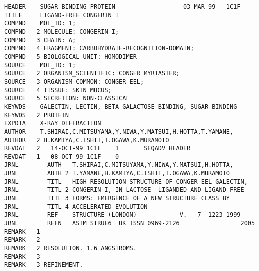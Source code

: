 \begin{lstlisting}
HEADER    SUGAR BINDING PROTEIN                   03-MAR-99   1C1F              
TITLE     LIGAND-FREE CONGERIN I                                                
COMPND    MOL_ID: 1;                                                            
COMPND   2 MOLECULE: CONGERIN I;                                                
COMPND   3 CHAIN: A;                                                            
COMPND   4 FRAGMENT: CARBOHYDRATE-RECOGNITION-DOMAIN;                           
COMPND   5 BIOLOGICAL_UNIT: HOMODIMER                                           
SOURCE    MOL_ID: 1;                                                            
SOURCE   2 ORGANISM_SCIENTIFIC: CONGER MYRIASTER;                               
SOURCE   3 ORGANISM_COMMON: CONGER EEL;                                         
SOURCE   4 TISSUE: SKIN MUCUS;                                                  
SOURCE   5 SECRETION: NON-CLASSICAL                                             
KEYWDS    GALECTIN, LECTIN, BETA-GALACTOSE-BINDING, SUGAR BINDING               
KEYWDS   2 PROTEIN                                                              
EXPDTA    X-RAY DIFFRACTION                                                     
AUTHOR    T.SHIRAI,C.MITSUYAMA,Y.NIWA,Y.MATSUI,H.HOTTA,T.YAMANE,                
AUTHOR   2 H.KAMIYA,C.ISHII,T.OGAWA,K.MURAMOTO                                  
REVDAT   2   14-OCT-99 1C1F    1       SEQADV HEADER                            
REVDAT   1   08-OCT-99 1C1F    0                                                
JRNL        AUTH   T.SHIRAI,C.MITSUYAMA,Y.NIWA,Y.MATSUI,H.HOTTA,                
JRNL        AUTH 2 T.YAMANE,H.KAMIYA,C.ISHII,T.OGAWA,K.MURAMOTO                 
JRNL        TITL   HIGH-RESOLUTION STRUCTURE OF CONGER EEL GALECTIN,            
JRNL        TITL 2 CONGERIN I, IN LACTOSE- LIGANDED AND LIGAND-FREE             
JRNL        TITL 3 FORMS: EMERGENCE OF A NEW STRUCTURE CLASS BY                 
JRNL        TITL 4 ACCELERATED EVOLUTION                                        
JRNL        REF    STRUCTURE (LONDON)            V.   7  1223 1999              
JRNL        REFN   ASTM STRUE6  UK ISSN 0969-2126                 2005          
REMARK   1                                                                      
REMARK   2                                                                      
REMARK   2 RESOLUTION. 1.6 ANGSTROMS.                                           
REMARK   3                                                                      
REMARK   3 REFINEMENT.                                                          

\end{lstlisting}
